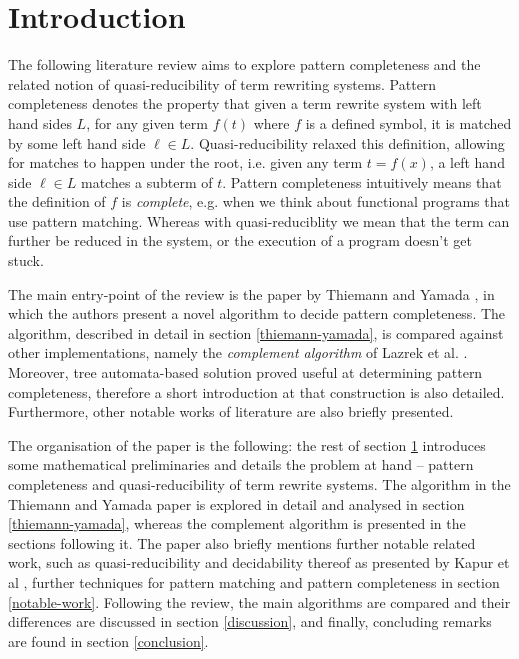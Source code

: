 \section{Introduction} \label{intro}

The following literature review aims to explore pattern completeness and the related notion of quasi-reducibility of term rewriting systems. Pattern completeness denotes the property that given a term rewrite system with left hand sides $L$, for any given term $f(t)$ where $f$ is a defined symbol, it is matched by some left hand side $\ell \in L$. Quasi-reducibility relaxed this definition, allowing for matches to happen under the root, i.e. given any term $t = f(x)$, a left hand side $\ell \in L$ matches a subterm of $t$. Pattern completeness intuitively means that the definition of $f$ is \textit{complete}, e.g. when we think about functional programs that use pattern matching. Whereas with quasi-reduciblity we mean that the term can further be reduced in the system, or the execution of a program doesn't get stuck. 

The main entry-point of the review is the paper by Thiemann and Yamada \cite{thiemann}, in which the authors present a novel algorithm to decide pattern completeness. The algorithm, described in detail in section \ref{thiemann-yamada}, is compared against other implementations, namely the \textit{complement algorithm} of Lazrek et al. \cite{lazrek}. Moreover, tree automata-based solution proved useful at determining pattern completeness, therefore a short introduction at that construction is also detailed. Furthermore, other notable works of literature are also briefly presented.

The organisation of the paper is the following: the rest of section \ref{intro} introduces some mathematical preliminaries and details the problem at hand – pattern completeness and quasi-reducibility of term rewrite systems. The algorithm in the Thiemann and Yamada paper is explored in detail and analysed in section \ref{thiemann-yamada}, whereas the complement algorithm is presented in the sections following it. The paper also briefly mentions further notable related work, such as quasi-reducibility and decidability thereof as presented by Kapur et al \cite{kapur}, further techniques for pattern matching and pattern completeness in section \ref{notable-work}. Following the review, the main algorithms are compared and their differences are discussed in section \ref{discussion}, and finally, concluding remarks are found in section \ref{conclusion}.

